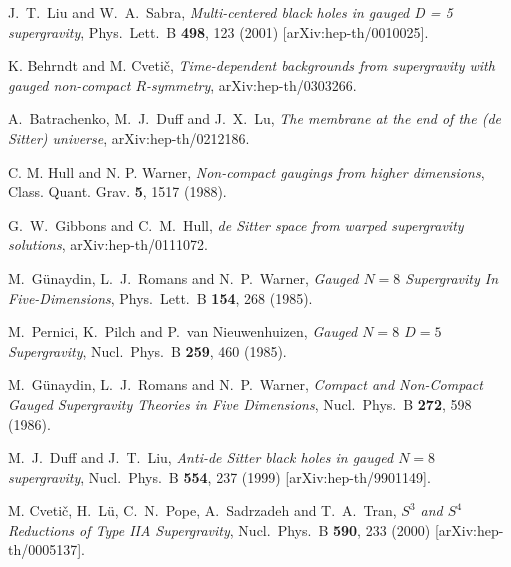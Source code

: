 \documentclass[a4paper,12pt]{article}
\begin{document}
\begin{thebibliography}{99}
J.~T.~Liu and W.~A.~Sabra,
{\sl Multi-centered black holes in gauged D = 5 supergravity},
Phys.\ Lett.\ B {\bf 498}, 123 (2001) [arXiv:hep-th/0010025].

K. Behrndt and M. Cveti\v{c},
{\sl Time-dependent backgrounds from supergravity with gauged non-compact
$R$-symmetry},
arXiv:hep-th/0303266.

A.~Batrachenko, M.~J.~Duff and J.~X.~Lu,
{\sl The membrane at the end of the (de Sitter) universe},
arXiv:hep-th/0212186.

C. M. Hull and N. P. Warner,
{\sl Non-compact gaugings from higher dimensions},
Class. Quant. Grav. {\bf 5}, 1517 (1988).

G.~W.~Gibbons and C.~M.~Hull,
{\sl de Sitter space from warped supergravity solutions},
arXiv:hep-th/0111072.

M.~G\"unaydin, L.~J.~Romans and N.~P.~Warner,
{\sl Gauged $N=8$ Supergravity In Five-Dimensions},
Phys.\ Lett.\ B {\bf 154}, 268 (1985).

M.~Pernici, K.~Pilch and P.~van Nieuwenhuizen,
{\sl Gauged $N=8$ $D=5$ Supergravity},
Nucl.\ Phys.\ B {\bf 259}, 460 (1985).

M.~G\"{u}naydin, L.~J.~Romans and N.~P.~Warner,
{\sl Compact and Non-Compact Gauged Supergravity Theories in Five Dimensions},
Nucl.\ Phys.\ B {\bf 272}, 598 (1986).

M.~J.~Duff and J.~T.~Liu,
{\sl Anti-de Sitter black holes in gauged $N = 8$ supergravity},
Nucl.\ Phys.\ B {\bf 554}, 237 (1999) [arXiv:hep-th/9901149].

M. Cveti\v{c}, H.~L\"u, C.~N.~Pope, A.~Sadrzadeh and T.~A.~Tran, 
{\sl $S^3$ and $S^4$ Reductions of Type IIA Supergravity}, 
Nucl.\ Phys.\ B {\bf 590}, 233 (2000) [arXiv:hep-th/0005137].

\end{thebibliography}
\end{document}
